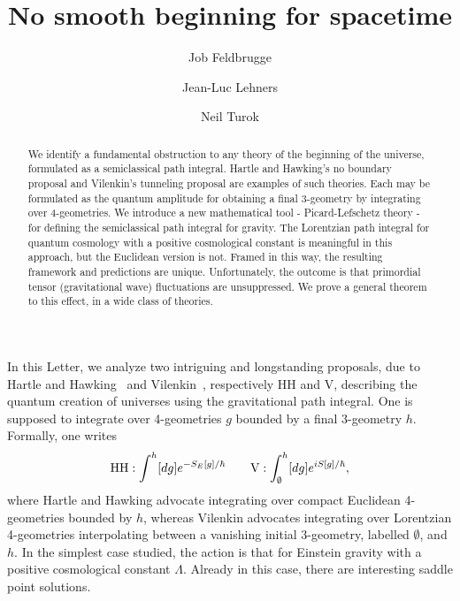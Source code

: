 \documentclass[twocolumn,amsmath,amssymb,superscriptaddress,nofootinbib]{revtex4-1}
\begin{document}
\allowdisplaybreaks
\begin{titlepage}

\title{
No smooth beginning for spacetime
}

\author{Job Feldbrugge}
\author{Jean-Luc Lehners}
\author{Neil Turok}

\begin{abstract}
\noindent 
We identify a fundamental obstruction to any theory of the beginning of the universe, formulated as a semiclassical path integral. Hartle and Hawking's no boundary proposal and Vilenkin's tunneling proposal are examples of such theories. Each may be formulated as the quantum amplitude for obtaining a final 3-geometry by integrating over 4-geometries. We introduce a new mathematical tool - Picard-Lefschetz theory - for defining the semiclassical path integral for gravity. The Lorentzian path integral for quantum cosmology with a positive cosmological constant is meaningful in this approach, but the Euclidean version is not. Framed in this way, the resulting framework and predictions are unique. Unfortunately, the outcome is that primordial tensor (gravitational wave) fluctuations are unsuppressed. We prove a general theorem to this effect, in a wide class of theories. 
\end{abstract}
\maketitle
\end{titlepage}

In this Letter, we analyze two intriguing and longstanding proposals, due to Hartle and Hawking~\cite{Hartle:1983ai,Halliwell:1984eu} and Vilenkin~\cite{Vilenkin:1984wp,Vilenkin:1994rn}, respectively HH and V, describing the quantum creation of universes using the gravitational path integral. One is supposed to integrate over 4-geometries $g$ bounded by a final 3-geometry $h$. Formally, one writes
\begin{align}
{\rm HH}: \int^{h} [ dg] e^{-S_E[g] /\hbar} \qquad {\rm V}: \int^{h}_{\emptyset}[ dg] e^{i S[g] /\hbar}, 
\label{eq:LPLres}
\end{align}
where Hartle and Hawking advocate integrating over compact Euclidean 4-geometries bounded by $h$, whereas Vilenkin advocates integrating over Lorentzian 4-geometries interpolating between a vanishing initial 3-geometry, labelled $\emptyset$, and $h$. In the simplest case studied, the action is that for Einstein gravity with a positive cosmological constant $\Lambda$. Already in this case, there are interesting saddle point solutions. 
\end{document}
